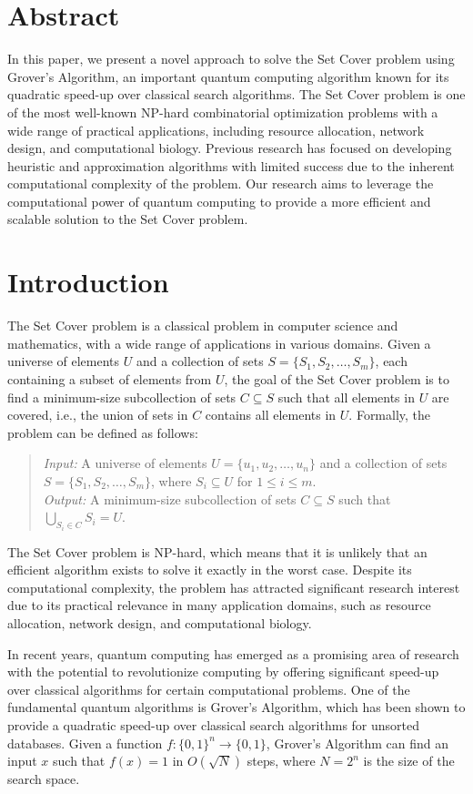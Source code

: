 \section{Abstract}
In this paper, we present a novel approach to solve the Set Cover problem using Grover's Algorithm, an important quantum computing algorithm known for its quadratic speed-up over classical search algorithms. The Set Cover problem is one of the most well-known NP-hard combinatorial optimization problems with a wide range of practical applications, including resource allocation, network design, and computational biology. Previous research has focused on developing heuristic and approximation algorithms with limited success due to the inherent computational complexity of the problem. Our research aims to leverage the computational power of quantum computing to provide a more efficient and scalable solution to the Set Cover problem.

\section{Introduction}
The Set Cover problem is a classical problem in computer science and mathematics, with a wide range of applications in various domains. Given a universe of elements $U$ and a collection of sets $S = \{S_1, S_2, \dots, S_m\}$, each containing a subset of elements from $U$, the goal of the Set Cover problem is to find a minimum-size subcollection of sets $C \subseteq S$ such that all elements in $U$ are covered, i.e., the union of sets in $C$ contains all elements in $U$. Formally, the problem can be defined as follows:

\begin{quote}
\emph{Input:} A universe of elements $U = \{u_1, u_2, \dots, u_n\}$ and a collection of sets $S = \{S_1, S_2, \dots, S_m\}$, where $S_i \subseteq U$ for $1 \leq i \leq m$.\\
\emph{Output:} A minimum-size subcollection of sets $C \subseteq S$ such that $\bigcup_{S_i \in C}S_i = U$.
\end{quote}

The Set Cover problem is NP-hard, which means that it is unlikely that an efficient algorithm exists to solve it exactly in the worst case. Despite its computational complexity, the problem has attracted significant research interest due to its practical relevance in many application domains, such as resource allocation, network design, and computational biology.

In recent years, quantum computing has emerged as a promising area of research with the potential to revolutionize computing by offering significant speed-up over classical algorithms for certain computational problems. One of the fundamental quantum algorithms is Grover's Algorithm, which has been shown to provide a quadratic speed-up over classical search algorithms for unsorted databases. Given a function $f: \{0,1\}^n \rightarrow \{0,1\}$, Grover's Algorithm can find an input $x$ such that $f(x) = 1$ in $O(\sqrt{N})$ steps, where $N = 2^n$ is the size of the search space.


